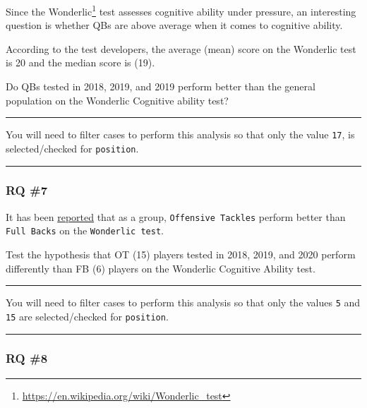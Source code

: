 \documentclass[
]{article}
\begin{document}
Since the Wonderlic\footnote{\url{https://en.wikipedia.org/wiki/Wonderlic_test}} test assesses cognitive ability under pressure, an interesting question is whether QBs are above average when it comes to cognitive ability.

According to the test developers, the average (mean) score on the Wonderlic test is 20 and the median score is (19).

Do QBs tested in 2018, 2019, and 2019 perform better than the general population on the Wonderlic Cognitive ability test?

\begin{center}\rule{0.5\linewidth}{0.5pt}\end{center}

You will need to filter cases to perform this analysis so that only the value \texttt{17}, is selected/checked for \texttt{position}.

\begin{center}\rule{0.5\linewidth}{0.5pt}\end{center}

\hypertarget{rq-7}{%
\subsubsection{RQ \#7}\label{rq-7}}

It has been \href{https://www.cbssports.com/nfl/news/nfl-draft-combine-the-highest-and-lowest-wonderlic-test-scores-ever-recorded/}{reported} that as a group, \texttt{Offensive\ Tackles} perform better than \texttt{Full\ Backs} on the \texttt{Wonderlic\ test}.

Test the hypothesis that OT (15) players tested in 2018, 2019, and 2020 perform differently than FB (6) players on the Wonderlic Cognitive Ability test.

\begin{center}\rule{0.5\linewidth}{0.5pt}\end{center}

You will need to filter cases to perform this analysis so that only the values \texttt{5} and \texttt{15} are selected/checked for \texttt{position}.

\begin{center}\rule{0.5\linewidth}{0.5pt}\end{center}

\hypertarget{rq-8}{%
\subsubsection{RQ \#8}\label{rq-8}}
\end{document}
